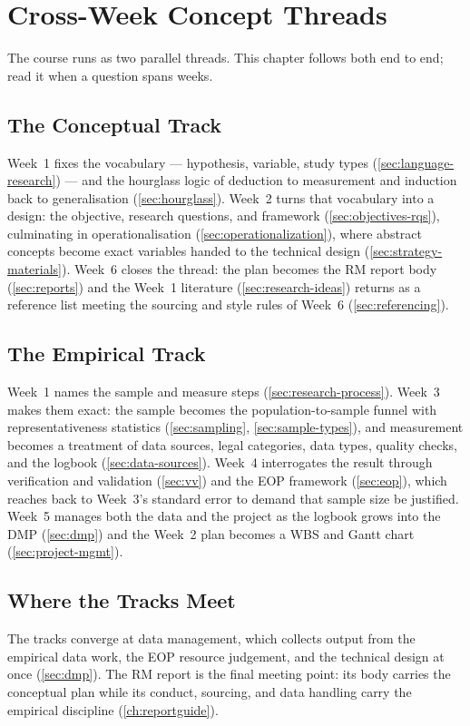 \documentclass[../main.tex]{subfiles}
\begin{document}
\setlength{\parskip}{3pt}

\chapter{Cross-Week Concept Threads}
\label{ch:crossweek}

The course runs as two parallel threads. This chapter follows both end to end; read it when a question spans weeks.

\section{The Conceptual Track}
\label{sec:thread-conceptual}

Week~1 fixes the vocabulary — hypothesis, variable, study types (\autoref{sec:language-research}) — and the hourglass logic of deduction to measurement and induction back to generalisation (\autoref{sec:hourglass}). Week~2 turns that vocabulary into a design: the objective, research questions, and framework (\autoref{sec:objectives-rqs}), culminating in operationalisation (\autoref{sec:operationalization}), where abstract concepts become exact variables handed to the technical design (\autoref{sec:strategy-materials}). Week~6 closes the thread: the plan becomes the RM report body (\autoref{sec:reports}) and the Week~1 literature (\autoref{sec:research-ideas}) returns as a reference list meeting the sourcing and style rules of Week~6 (\autoref{sec:referencing}).

\section{The Empirical Track}
\label{sec:thread-empirical}

Week~1 names the sample and measure steps (\autoref{sec:research-process}). Week~3 makes them exact: the sample becomes the population-to-sample funnel with representativeness statistics (\autoref{sec:sampling}, \autoref{sec:sample-types}), and measurement becomes a treatment of data sources, legal categories, data types, quality checks, and the logbook (\autoref{sec:data-sources}). Week~4 interrogates the result through verification and validation (\autoref{sec:vv}) and the EOP framework (\autoref{sec:eop}), which reaches back to Week~3's standard error to demand that sample size be justified. Week~5 manages both the data and the project as the logbook grows into the DMP (\autoref{sec:dmp}) and the Week~2 plan becomes a WBS and Gantt chart (\autoref{sec:project-mgmt}).

\section{Where the Tracks Meet}
\label{sec:thread-meet}

The tracks converge at data management, which collects output from the empirical data work, the EOP resource judgement, and the technical design at once (\autoref{sec:dmp}). The RM report is the final meeting point: its body carries the conceptual plan while its conduct, sourcing, and data handling carry the empirical discipline (\autoref{ch:reportguide}).
\end{document}
